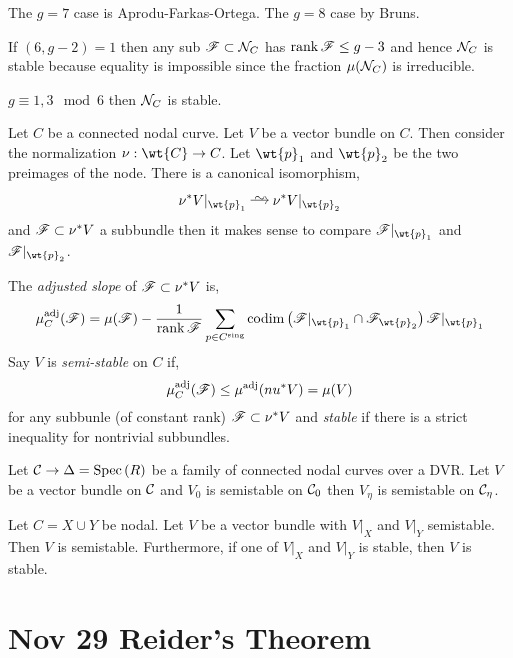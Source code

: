\documentclass[12pt]{article}
\begin{document}
\begin{rmk}
The $g = 7$ case is Aprodu-Farkas-Ortega. The $g = 8$ case by Bruns. 
\end{rmk}

If $(6, g-2) = 1$ then any sub $\mathscr{F} \subset \mathcal{N}_C$ has $\operatorname{\mathrm{rank}}{\mathscr{F}} \le g - 3$ and hence $\mathcal{N}_C$ is stable because equality is impossible since the fraction $\mu(\mathcal{N}_C)$ is irreducible. 

\begin{cor}
$g \equiv 1,3 \mod 6$ then $\mathcal{N}_C$ is stable.
\end{cor}

Let $C$ be a connected nodal curve. Let $V$ be a vector bundle on $C$. Then consider the normalization $\nu : \wt{C} \to C$. Let $\wt{p}_1$ and $\wt{p}_2$ be the two preimages of the node. There is a canonical isomorphism,
\[ \nu^* V |_{\wt{p}_1} \iso \nu^* V |_{\wt{p}_2} \]
and $\mathscr{F} \subset \nu^* V$ a subbundle then it makes sense to compare $\F|_{\wt{p}_1}$ and $\F|_{\wt{p}_2}$. 

\newcommand{\adj}{\mathrm{adj}}

\begin{defn}
The \textit{adjusted slope} of $\mathscr{F} \subset \nu^* V$ is,
\[ \mu^{\adj}_C(\F) = \mu(\F) - \frac{1}{\rank{\F}} \sum_{p \in C^{\text{sing}}} \codim{\F|_{\wt{p}_1} \cap \F_{\wt{p}_2}}{\F|_{\wt{p}_1}} \]
Say $V$ is \textit{semi-stable} on $C$ if,
\[ \mu^{\adj}_C(\F) \le \mu^{\adj}(nu^* V) = \mu(V) \]
for any subbunle (of constant rank) $\mathscr{F} \subset \nu^* V$ and \textit{stable} if there is a strict inequality for nontrivial subbundles.
\end{defn}

\begin{prop}[CIV, 2022]
Let $\mathcal{C} \to \Delta = \mathrm{Spec}\left( R \right)$ be a family of connected nodal curves over a DVR. Let $V$ be a vector bundle on $\mathcal{C}$ and $V_0$ is semistable on $\mathcal{C}_0$ then $V_\eta$ is semistable on $\mathcal{C}_\eta$.
\end{prop}

\begin{lemma}
Let $C = X \cup Y$ be nodal. Let $V$ be a vector bundle with $V|_X$ and $V|_Y$ semistable. Then $V$ is semistable. Furthermore, if one of $V|_X$ and $V|_Y$ is stable, then $V$ is stable.
\end{lemma}

\section{Nov 29 Reider's Theorem}
\end{document}
